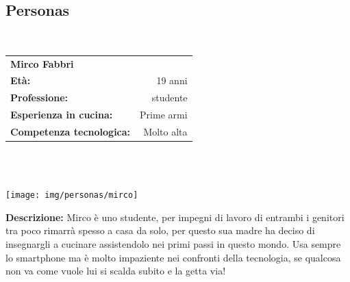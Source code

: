 \subsection{Personas}
\hrulefill\\
\begin{minipage}{.75\textwidth}
\begin{tabular}{l | r}
	\textbf{Mirco Fabbri} & \\
	\textbf{Età:} & 19 anni\\
	\textbf{Professione:} & studente\\
	\textbf{Esperienza in cucina:} & Prime armi\\
	\textbf{Competenza tecnologica:} & Molto alta\\
\end{tabular}\\\\
\end{minipage}
\begin{minipage}{.24\textwidth}
	\texttt{[image: img/personas/mirco]}
\end{minipage}
	\textbf{Descrizione:}  Mirco è uno studente, per impegni di lavoro di
	entrambi i genitori tra poco rimarrà spesso a casa da solo, per questo
	sua madre ha deciso di insegnargli a cucinare assistendolo nei primi
	passi in questo mondo.  Usa sempre lo smartphone ma è molto impaziente
	nei confronti della tecnologia, se qualcosa non va come vuole lui si
	scalda subito e la getta via!\\

